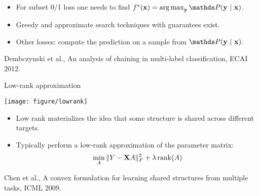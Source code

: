 \documentclass[11pt,compress,t,notes=noshow, xcolor=table]{beamer}
\begin{document}
\begin{frame}[fragile]
	\vspace{0.1cm}
	\begin{itemize}\small
		\item For subset 0/1 loss one needs to find $
		\fbayes(\xv) = \argmax_{\yv} \P(\yv ~|~ \xv)
		$.
		\item Greedy and approximate search techniques with guarantees exist.
		\item Other losses: compute the prediction on a sample from $\P(\yv ~|~  \xv).$
	\end{itemize}
{\tiny Dembczynski et al., An analysis of chaining in multi-label classification, ECAI 2012.}
	
\end{frame}



\begin{frame}{Low-rank approximation}
	
	\begin{center}
		\texttt{[image: figure/lowrank]}
	\end{center}

	\begin{itemize}
%		
		\item Low rank materializes the idea that some structure is shared across different targets.
%
		\item 	Typically perform a low-rank approximation of the parameter matrix:
		$$\min_A \|Y - \mathbf{X} A \|^2_F + \lambda \, \mathrm{rank}(A)$$
%		
	\end{itemize}
	{\tiny Chen et al., A convex formulation for learning shared structures from
	multiple tasks, ICML 2009.}
\end{frame}



\end{document}
